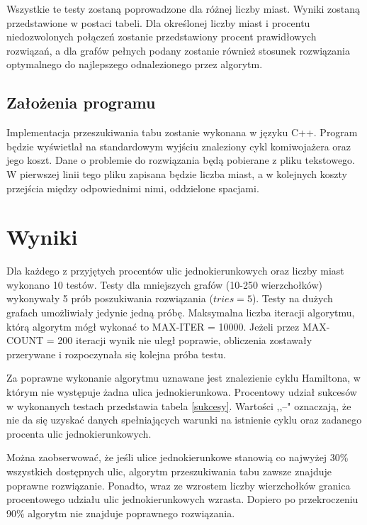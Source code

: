 \documentclass[11pt,a4paper,twoside]{article}
\begin{document}
Wszystkie te testy zostaną poprowadzone dla różnej liczby miast. Wyniki zostaną przedstawione w postaci tabeli. Dla określonej liczby miast i procentu niedozwolonych połączeń zostanie przedstawiony procent prawidłowych rozwiązań, a dla grafów pełnych podany zostanie również stosunek rozwiązania optymalnego do najlepszego odnalezionego przez algorytm. 
\subsection{Założenia programu}
Implementacja przeszukiwania tabu zostanie wykonana w języku C++. Program będzie wyświetlał na standardowym wyjściu znaleziony cykl komiwojażera oraz jego koszt. Dane o problemie do rozwiązania będą pobierane z pliku tekstowego. W pierwszej linii tego pliku zapisana będzie liczba miast, a w kolejnych koszty przejścia między odpowiednimi nimi, oddzielone spacjami.

\section{Wyniki}
Dla każdego z przyjętych procentów ulic jednokierunkowych oraz liczby miast wykonano 10 testów. Testy dla mniejszych grafów (10-250 wierzchołków) wykonywały 5 prób poszukiwania rozwiązania ($tries=5$). Testy na dużych grafach umożliwiały jedynie jedną próbę. Maksymalna liczba iteracji algorytmu, którą algorytm mógł wykonać to MAX-ITER = 10000. Jeżeli przez MAX-COUNT = 200 iteracji wynik nie uległ poprawie, obliczenia zostawały przerywane i rozpoczynała się kolejna próba testu.

Za poprawne wykonanie algorytmu uznawane jest znalezienie cyklu Hamiltona, w którym nie występuje żadna ulica jednokierunkowa. Procentowy udział sukcesów w wykonanych testach przedstawia tabela \ref{sukcesy}. Wartości ,,--" oznaczają, że nie da się uzyskać danych spełniających warunki na istnienie cyklu oraz zadanego procenta ulic jednokierunkowych. 

Można zaobserwować, że jeśli ulice jednokierunkowe stanowią co najwyżej 30\% wszystkich dostępnych ulic, algorytm przeszukiwania tabu zawsze znajduje poprawne rozwiązanie. Ponadto, wraz ze wzrostem liczby wierzchołków granica procentowego udziału ulic jednokierunkowych wzrasta. Dopiero po przekroczeniu 90\% algorytm nie znajduje poprawnego rozwiązania.
\end{document}
